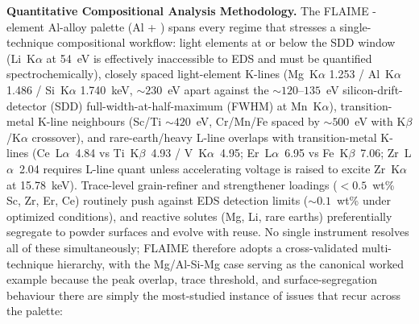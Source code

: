 \documentclass[11pt,letterpaper]{article}
\newcounter{elemctr}
\newcommand{\elementcount}{\theelemctr}  %
\def\elementlisttex{}
\begin{document}
\medskip
\noindent\textbf{Quantitative Compositional Analysis Methodology.}
The FLAIME \elementcount-element Al-alloy palette (Al + \elementlisttex{}) spans every regime that stresses a
single-technique compositional workflow: light elements at or below the
SDD window (Li~K$\alpha$ at 54~eV is effectively inaccessible to EDS and
must be quantified spectrochemically), closely spaced light-element
K-lines (Mg~K$\alpha$ 1.253 / Al~K$\alpha$ 1.486 / Si~K$\alpha$
1.740~keV, ${\sim}230$~eV apart against the ${\sim}120$--$135$~eV
silicon-drift-detector (SDD) full-width-at-half-maximum (FWHM) at
Mn~K$\alpha$), transition-metal K-line neighbours (Sc/Ti ${\sim}420$~eV,
Cr/Mn/Fe spaced by ${\sim}500$~eV with K$\beta$/K$\alpha$ crossover), and
rare-earth/heavy L-line overlaps with transition-metal K-lines
(Ce~L$\alpha$~4.84 vs Ti~K$\beta$~4.93 / V~K$\alpha$~4.95; Er~L$\alpha$~6.95
vs Fe~K$\beta$~7.06; Zr~L$\alpha$~2.04 requires L-line quant unless
accelerating voltage is raised to excite Zr~K$\alpha$ at 15.78~keV).
Trace-level grain-refiner and strengthener loadings ($<0.5$~wt\% Sc, Zr,
Er, Ce) routinely push against EDS detection limits (${\sim}0.1$~wt\%
under optimized conditions), and reactive solutes (Mg, Li, rare earths)
preferentially segregate to powder surfaces and evolve with reuse. No
single instrument resolves all of these simultaneously; FLAIME therefore
adopts a cross-validated multi-technique hierarchy, with the Mg/Al-Si-Mg
case serving as the canonical worked example because the peak overlap,
trace threshold, and surface-segregation behaviour there are simply the
most-studied instance of issues that recur across the palette:
\end{document}
